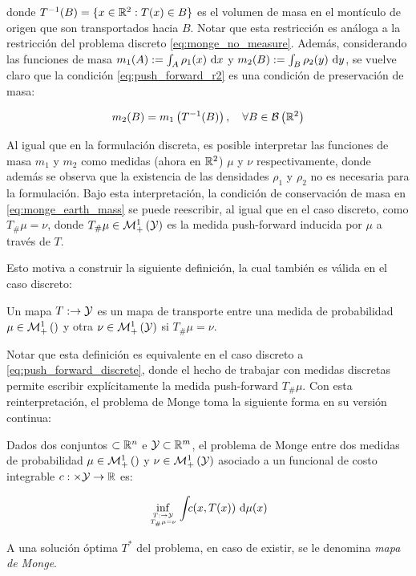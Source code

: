 donde $T^{-1}(B) = \{x\in\mathbb{R}^2 : T(x)\in B\}$ es el volumen de masa en el montículo de origen que son transportados hacia $B$. Notar que esta restricción es análoga a la restricción del problema discreto \eqref{eq:monge_no_measure}. Además, considerando las funciones de masa $m_1(A) := \int_A \rho_1(x)\,\operatorname{d}\! x$ y $m_2(B) := \int_B \rho_2(y)\,\operatorname{d}\! y$, se vuelve claro que la condición \eqref{eq:push_forward_r2} es una condición de preservación de masa:

\begin{equation}
	\label{eq:monge_earth_mass}
	m_2(B) = m_1\left(T^{-1}(B)\right),
	\quad\forall B\in\mathcal{B}\left(\mathbb{R}^2\right)
\end{equation}

Al igual que en la formulación discreta, es posible interpretar las funciones de masa $m_1$ y $m_2$ como medidas (ahora en $\mathbb{R}^2$) $\mu$ y $\nu$ respectivamente, donde además se observa que la existencia de las densidades $\rho_1$ y $\rho_2$ no es necesaria para la formulación. Bajo esta interpretación, la condición de conservación de masa en \eqref{eq:monge_earth_mass} se puede reescribir, al igual que en el caso discreto, como $T_\#\mu = \nu$, donde $T_\#\mu\in\mathcal{M}_+^1\left(\mathcal{Y}\right)$ es la medida push-forward inducida por $\mu$ a través de $T$.

Esto motiva a construir la siguiente definición, la cual también es válida en el caso discreto:

\begin{defn}
	Un mapa $T:\to\mathcal{Y}$ es un mapa de transporte entre una medida de probabilidad $\mu\in\mathcal{M}_+^1\left(\right)$ y otra $\nu\in\mathcal{M}_+^1\left(\mathcal{Y}\right)$ si $T_\#\mu = \nu$.
\end{defn}

Notar que esta definición es equivalente en el caso discreto a \eqref{eq:push_forward_discrete}, donde el hecho de trabajar con medidas discretas permite escribir explícitamente la medida push-forward $T_\#\mu$. Con esta reinterpretación, el problema de Monge toma la siguiente forma en su versión continua:

\begin{defn}
	Dados dos conjuntos $\subset\mathbb{R}^n$ e $\mathcal{Y}\subset\mathbb{R}^m$, el problema de Monge entre dos medidas de probabilidad $\mu\in\mathcal{M}_+^1\left(\right)$ y $\nu\in\mathcal{M}_+^1\left(\mathcal{Y}\right)$ asociado a un funcional de costo integrable $c:\times\mathcal{Y}\to\mathbb{R}$ es:

	\begin{equation}
		\label{eq:monge_continuous}
		\inf_{\feasible{T:\xspace\to\yspace}{T_\#\mu=\nu}}
		\int_{\xspace} c(x, T(x)) \d\mu(x)
	\end{equation}

	A una solución óptima $T^*$ del problema, en caso de existir, se le denomina \textit{mapa de Monge}.
\end{defn}

